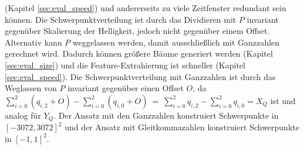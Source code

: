 (Kapitel \ref{sec:eval_speed}) und andererseits zu viele Zeitfenster redundant sein können.
\newline
\newline
Die Schwerpunktverteilung ist durch das Dividieren mit $P$ invariant gegenüber Skalierung der Helligkeit, jedoch nicht gegenüber einem Offset. Alternativ kann $P$ weggelassen werden, damit ausschließlich
mit Ganzzahlen gerechnet wird. Dadurch können größere Bäume generiert werden (Kapitel \ref{sec:eval_size}) und die Feature-Extrahierung ist schneller (Kapitel \ref{sec:eval_speed}). Die Schwerpunktverteilung
mit Ganzzahlen ist durch das Weglassen von $P$ invariant gegenüber einen Offset $O$, da $\sum_{i=0}^{2}(q_{i,2} + O) - \sum_{i=0}^{2}(q_{i,0} + O)\ =\ \sum_{i=0}^{2} q_{i,2} - \sum_{i=0}^{2} q_{i,0} = X_Q$
ist und analog für $Y_Q$. Der Ansatz mit den Ganzzahlen konstruiert Schwerpunkte in $[-3072, 3072]^2$ und der Ansatz mit Gleitkommazahlen konstruiert Schwerpunkte in $[-1, 1]^2$.
